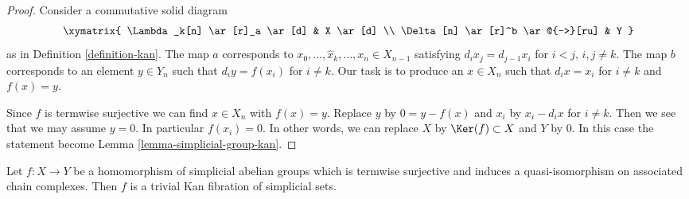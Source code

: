\begin{proof}
Consider a commutative solid diagram
$$
\xymatrix{
\Lambda_k[n] \ar[r]_a \ar[d] & X \ar[d] \\
\Delta[n] \ar[r]^b \ar@{-->}[ru] & Y
}
$$
as in Definition \ref{definition-kan}. The map $a$ corresponds
to $x_0, \ldots, \hat x_k, \ldots, x_n \in X_{n - 1}$ satisfying
$d_i x_j = d_{j - 1} x_i$ for $i < j$, $i, j \not = k$.
The map $b$ corresponds to an element $y \in Y_n$ such
that $d_iy = f(x_i)$ for $i \not = k$. Our task is to produce an
$x \in X_n$ such that $d_ix = x_i$ for $i \not = k$ and $f(x) = y$.

\medskip\noindent
Since $f$ is termwise surjective we can find $x \in X_n$ with $f(x) = y$.
Replace $y$ by $0 = y - f(x)$ and $x_i$ by $x_i - d_ix$ for $i \not = k$.
Then we see that we may assume $y = 0$. In particular $f(x_i) = 0$.
In other words, we can replace $X$ by $\Ker(f) \subset X$
and $Y$ by $0$. In this case the statement become
Lemma \ref{lemma-simplicial-group-kan}.
\end{proof}

\begin{lemma}
\label{lemma-qis-simplicial-abelian-groups}
Let $f : X \to Y$ be a homomorphism of simplicial abelian groups
which is termwise surjective and induces a quasi-isomorphism on
associated chain complexes. Then $f$ is a trivial Kan fibration of
simplicial sets.
\end{lemma}

